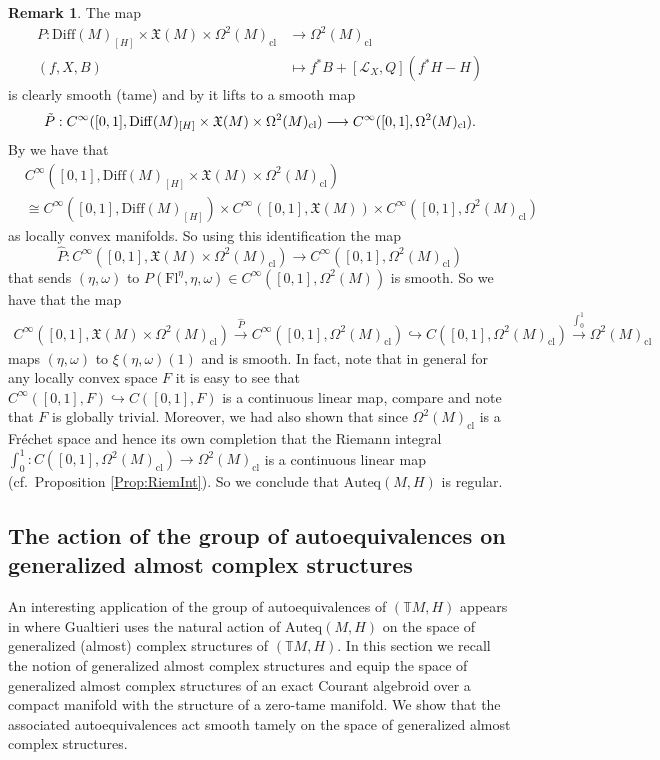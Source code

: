 \documentclass[12pt,a4paper]{article}
\theoremstyle{plain}
\theoremstyle{definition}
\newtheorem{remark}[theorem]{Remark}
\newcommand{\om}{\omega}
\newcommand{\VFs}{\mathfrak{X}(M)}
\newcommand{\Forms}[1]{\Omega^{#1}(M)}
\newcommand{\ClForms}[1]{\Forms{#1}_{\mathrm{cl}}}
\newcommand{\LieD}{\mathcal{L}}
\newcommand{\SDiff}{\mathrm{Diff}(M)_{[H]}}
\newcommand{\Auteq}{\mathrm{Auteq}(M,H)}
\newcommand{\GenTM}{\mathbb TM}
\begin{document}
\begin{remark}
The map 
\begin{align*}
    P:\SDiff\times \VFs \times \ClForms{2}&\longrightarrow \ClForms{2}\\
    (f,X,B)&\longmapsto f^*B+[\LieD_X,Q](f^*H-H)
\end{align*}
is clearly smooth (tame) and by \cite[Corollary 2.19, Proposition C.16, and p.~214, C.2]{schmeding_2022} it lifts to a smooth map
\begin{align*}
    \Tilde{P}:C^\infty([0,1],\SDiff\times \VFs \times \ClForms{2})\longrightarrow C^\infty([0,1],\ClForms{2}).
\end{align*}
By \cite[Corollary 2.19, Proposition C.16, and Definition 2.14]{schmeding_2022} we have that 
\begin{align*}
    &C^\infty([0,1],\SDiff\times \VFs \times \ClForms{2})\\
    &\cong C^\infty([0,1],\SDiff)\times C^\infty([0,1],\VFs) \times C^\infty([0,1],\ClForms{2})
\end{align*}
as locally convex manifolds.
So using this identification the map $$\hat{P}: C^\infty([0,1],\VFs\times\ClForms{2})\longrightarrow  C^\infty([0,1],\ClForms{2})$$ that sends $(\eta,\om)$ to $P(\mathrm{Fl}^\eta,\eta,\om)\in C^\infty([0,1],\Forms{2})$ is smooth. So we have that the map 
\begin{align*}
   C^\infty([0,1],\VFs\times\ClForms{2})\xrightarrow{\hat{P}}  C^\infty([0,1],\ClForms{2})\hookrightarrow C([0,1],\ClForms{2})\xrightarrow{\int_0^1}\ClForms{2}
\end{align*}
maps $(\eta,\om)$ to $\xi(\eta,\om)(1)$ and is smooth. In fact, note that in general for any locally convex space $F$ it is easy to see that $C^\infty([0,1],F)\hookrightarrow C([0,1],F)$ is a continuous linear map, compare \cite[C.15]{schmeding_2022} and note that $F$ is globally trivial. Moreover, we had also shown that since $\ClForms{2}$ is a Fréchet space and hence its own completion that the Riemann integral $\int_0^1:C([0,1],\ClForms{2})\to\ClForms{2}$ is a continuous linear map (cf.~Proposition \ref{Prop:RiemInt}). So we conclude that $\Auteq$ is regular.
\end{remark}



\subsection{The action of the group of autoequivalences on generalized almost complex structures}

An interesting application of the group of autoequivalences of $(\GenTM,H)$ appears in \cite[Theorem 5.4]{gualtieri} where Gualtieri uses the natural action of $\Auteq$ on the space of generalized (almost) complex structures of $(\GenTM,H)$.
In this section we recall the notion of generalized almost complex structures and equip the space of generalized almost complex structures of an exact Courant algebroid over a compact manifold with the structure of a zero-tame manifold. We show that the associated autoequivalences act smooth tamely on the space of generalized almost complex structures. 
\end{document}
